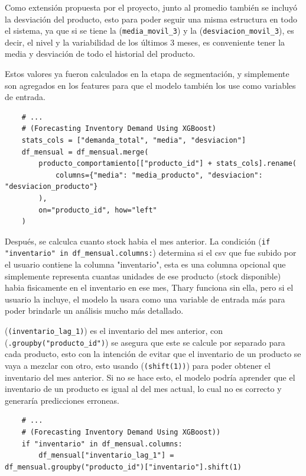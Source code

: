 Como extensión propuesta por el proyecto, junto al promedio también se incluyó la desviación del producto, esto para poder seguir una misma estructura en todo el sistema, ya que si se tiene la (\texttt{media\_movil\_3}) y la (\texttt{desviacion\_movil\_3}), es decir, el nivel y la variabilidad de los últimos 3 meses, es conveniente tener la media y desviación de todo el historial del producto.

Estos valores ya fueron calculados en la etapa de segmentación, y simplemente son agregados en los features para que el modelo también los use como variables de entrada.

\label{lst:features_historicas}
\begin{verbatim}
    # ...
    # (Forecasting Inventory Demand Using XGBoost)
    stats_cols = ["demanda_total", "media", "desviacion"]
    df_mensual = df_mensual.merge(
        producto_comportamiento[["producto_id"] + stats_cols].rename(
            columns={"media": "media_producto", "desviacion": "desviacion_producto"}
        ),
        on="producto_id", how="left"
    )
\end{verbatim}

Después, se calculca cuanto stock habia el mes anterior. La condición (\texttt{if "inventario" in df\_mensual.columns:}) determina si el csv que fue subido por el usuario contiene la columna "inventario", esta es una columna opcional que simplemente representa cuantas unidades de ese producto (stock disponible) habia fisicamente en el inventario en ese mes, Thary funciona sin ella, pero si el usuario la incluye, el modelo la usara como una variable de entrada más para poder brindarle un análisis mucho más detallado. 

(\texttt{(inventario\_lag\_1)}) es el inventario del mes anterior, con (\texttt{.groupby("producto\_id")}) se asegura que este se calcule por separado para cada producto, esto con la intención de evitar que el inventario de un producto se vaya a mezclar con otro, esto usando (\texttt{(shift(1))}) para poder obtener el inventario del mes anterior. Si no se hace esto, el modelo podría aprender que el inventario de un producto es igual al del mes actual, lo cual no es correcto y generaría predicciones erroneas. 

\label{lst:features_inventario_lag}
\begin{verbatim}
    # ...
    # (Forecasting Inventory Demand Using XGBoost))
    if "inventario" in df_mensual.columns:
        df_mensual["inventario_lag_1"] = df_mensual.groupby("producto_id")["inventario"].shift(1)
\end{verbatim}

